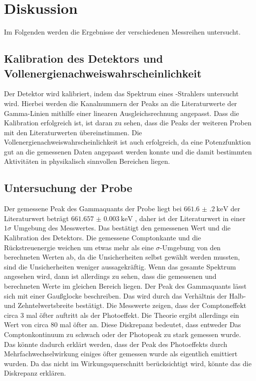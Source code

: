 \section{Diskussion}
\label{sec:Diskussion}
Im Folgenden werden die Ergebnisse der verschiedenen Messreihen untersucht.

\subsection{Kalibration des Detektors und Vollenergienachweiswahrscheinlichkeit}
Der Detektor wird kalibriert, indem das Spektrum eines -Strahlers untersucht wird.
Hierbei werden die Kanalnummern der Peaks an die Literaturwerte \cite{Gamma_lit} der Gamma-Linien mithilfe einer linearen 
Ausgleichsrechnung angepasst. Dass die Kalibration erfolgreich ist, ist daran zu sehen, dass die Peaks der weiteren
Proben mit den Literaturwerten übereinstimmen.
Die Vollenergienachweiswahrscheinlichkeit ist auch erfolgreich, da eine Potenzfunktion gut an die gemessenen Daten angepasst werden konnte und die 
damit bestimmten Aktivitäten in physikalisch sinnvollen Bereichen liegen. 

\subsection{Untersuchung der  Probe}
Der gemessene Peak des Gammaquants der  Probe liegt bei $\SI{661.6(2)}{\kilo\eV}$ der Literaturwert beträgt $\SI{661.657(3)}{\kilo\eV}$ \cite{Gamma_lit},
daher ist der Literaturwert in einer $1\sigma$ Umgebung des Messwertes. Das bestätigt den gemessenen Wert und die Kalibration des 
Detektors.
Die gemessene Comptonkante und die Rückstreuenergie weichen um etwas mehr als eine $\sigma$-Umgebung von den berechneten Werten ab, da die 
Unsicherheiten selbst gewählt werden mussten, sind die Unsicherheiten weniger aussagekräftig.
Wenn das gesamte Spektrum angesehen wird, dann ist allerdings 
zu sehen, dass die gemessenen und berechneten Werte im gleichen Bereich liegen.
Der Peak des Gammaquants lässt sich mit einer Gaußglocke beschreiben. Das wird durch das Verhältnis der Halb- und Zehntelwertsbreite 
bestätigt. 
Die Messwerte zeigen, dass der Comptoneffekt circa 3 mal öfter auftritt als der Photoeffekt. Die Theorie ergibt allerdings 
ein Wert von circa 80 mal öfter an. Diese Diskrepanz bedeutet, dass entweder Das Comptonkontinuum zu schwach oder der Photopeak
zu stark gemessen wurde. Das könnte dadurch erklärt werden, dass der Peak des Photoeffekts durch Mehrfachwechselwirkung 
einiges öfter gemessen wurde als eigentlich emittiert wurden. Da das nicht im Wirkungsquerschnitt berücksichtigt wird, 
könnte das die Diskrepanz erklären.
